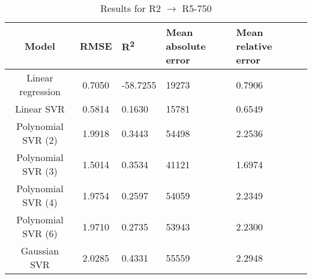 \begin{table}[H]
\centering
\begin{adjustbox}{center}
\begin{tabular}{c | c M{1.2cm} M{2.5cm} M{2.5cm} M{1.8cm}}
Model & RMSE & R\textsuperscript{2} & Mean absolute error & Mean relative error \tabularnewline
\hline
Linear regression & 0.7050 & -58.7255 &  19273 & 0.7906 \\
Linear SVR & 0.5814 & 0.1630 &  15781 & 0.6549 \\
Polynomial SVR (2) & 1.9918 & 0.3443 &  54498 & 2.2536 \\
Polynomial SVR (3) & 1.5014 & 0.3534 &  41121 & 1.6974 \\
Polynomial SVR (4) & 1.9754 & 0.2597 &  54059 & 2.2349 \\
Polynomial SVR (6) & 1.9710 & 0.2735 &  53943 & 2.2300 \\
Gaussian SVR & 2.0285 & 0.4331 &  55559 & 2.2948 \\
\end{tabular}
\end{adjustbox}
\\
\caption{Results for R2 $\rightarrow$ R5-750}
\label{tab:coreonly_linear_R2_R5_750}
\end{table}
